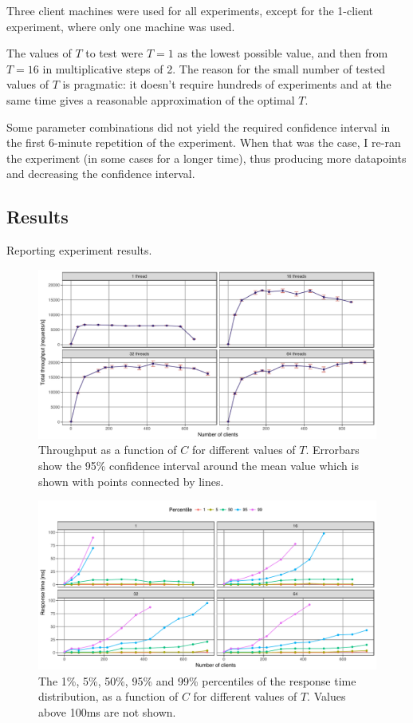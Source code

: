 \documentclass[11pt]{article}
\begin{document}
Three client machines were used for all experiments, except for the 1-client experiment, where only one machine was used.

The values of $T$ to test were $T=1$ as the lowest possible value, and then from $T=16$ in multiplicative steps of 2. The reason for the small number of tested values of $T$ is pragmatic: it doesn't require hundreds of experiments and at the same time gives a reasonable approximation of the optimal $T$.

Some parameter combinations did not yield the required confidence interval in the first 6-minute repetition of the experiment. When that was the case, I re-ran the experiment (in some cases for a longer time), thus producing more datapoints and decreasing the confidence interval.

\subsection{Results}
Reporting experiment results.

\begin{figure}[h]
\centering
\includegraphics[width=\textwidth]{../results/throughput/graphs/tp_vs_clients.pdf}
\caption{Throughput as a function of $C$ for different values of $T$. Errorbars show the 95\% confidence interval around the mean value which is shown with points connected by lines.}
\label{fig:exp1:res:throughput}
\end{figure}

\begin{figure}[h]
\centering
\includegraphics[width=\textwidth]{../results/throughput/graphs/response_time_vs_clients.pdf}
\caption{The 1\%, 5\%, 50\%, 95\% and 99\% percentiles of the response time distribution, as a function of $C$ for different values of $T$. Values above 100ms are not shown.}
\label{fig:exp1:res:responsetime}
\end{figure}
\end{document}
